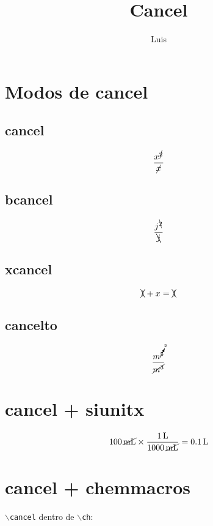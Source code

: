 \documentclass[10pt,a4paper]{article}
\title{Cancel}
\author{Luis}
\date{}
\begin{document}
\maketitle

\section{Modos de cancel}
\subsection{cancel}
\begin{equation*}
\frac{x^{\cancel{2}}}{\cancel{x}}
\end{equation*}

\subsection{bcancel}
\begin{equation*}
\frac{j^{\bcancel{2}}}{\bcancel{j}}
\end{equation*}

\subsection{xcancel}
\begin{equation*}
\xcancel{1} + x = \xcancel{1}
\end{equation*}

\subsection{cancelto}
\begin{equation*}
\frac{m^{\cancelto{2}{5}}}{\cancel{m^3}}
\end{equation*}

\section{cancel + siunitx}
\begin{equation*}
\SI{100}{\cancel\milli\liter} \times \frac{\SI{1}{\liter}}{\SI{1000}{\cancel\milli\liter}} = \SI{0.1}{\liter}
\end{equation*}


\section{cancel + chemmacros}
\texttt{$\backslash{}$cancel} dentro de \texttt{$\backslash{}$ch}:
\end{document}

